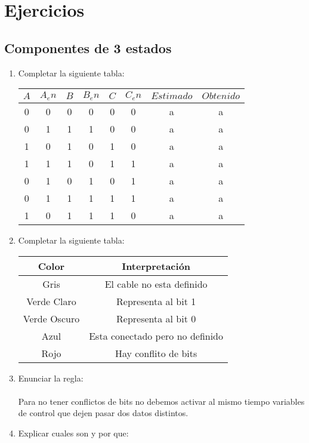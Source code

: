 \documentclass{article}
\title{}
\author{}
\date{}
\begin{document}
\maketitle

\section{Ejercicios}

\subsection{\textbf{Componentes de 3 estados}}
\begin{enumerate}
    \item Completar la siguiente tabla:
    \begin{center}
        \begin{tabular}{c c c c c c|c|c}
            $A$ & $A_en$ & $B$ & $B_en$ & $C$ &$C_en$ & $Estimado$ & $Obtenido$ \\\hline
            0 & 0 & 0 & 0 & 0 & 0 & a & a \\
            0 & 1 & 1 & 1 & 0 & 0 & a & a \\
            1 & 0 & 1 & 0 & 1 & 0 & a & a \\
            1 & 1 & 1 & 0 & 1 & 1 & a & a \\
            0 & 1 & 0 & 1 & 0 & 1 & a & a \\
            0 & 1 & 1 & 1 & 1 & 1 & a & a \\
            1 & 0 & 1 & 1 & 1 & 0 & a & a \\
        \end{tabular}
    \end{center}
    \item Completar la siguiente tabla:
    \begin{center}{
        \renewcommand{\arraystretch}{1.5}
        \begin{tabular}{c | c}
            Color & Interpretación \\ \hline
            Gris & El cable no esta definido\\ 
            Verde Claro & Representa al bit 1 \\
            Verde Oscuro & Representa al bit 0\\
            Azul & Esta conectado pero no definido\\
            Rojo & Hay conflito de bits\\
        \end{tabular}}
    \end{center}
    \item Enunciar la regla:\\\\
    Para no tener conflictos de bits no debemos activar al mismo tiempo variables de control que dejen pasar dos datos distintos.\\
    \item Explicar cuales son y por que:
\end{enumerate}
\end{document}
